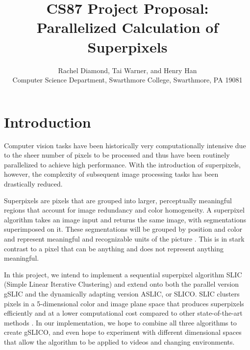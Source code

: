 \documentclass[11pt]{article}
\begin{document}

\title{CS87 Project Proposal: Parallelized Calculation of Superpixels}

\author{Rachel Diamond, Tai Warner, and Henry Han \\
Computer Science Department, Swarthmore College, Swarthmore, PA  19081}

\maketitle

\section {Introduction}\label{intro}
Computer vision tasks have been historically very computationally intensive due to the sheer number of pixels to be processed and thus have been routinely parallelized to achieve high performance. With the introduction of superpixels, however, the complexity of subsequent image processing tasks has been drastically reduced.

Superpixels are pixels that are grouped into larger, perceptually meaningful regions that account for image redundancy and color homogeneity. A superpixel algorithm takes an image input and returns the same image, with segmentations superimposed on it. These segmentations will be grouped by position and color and represent meaningful and recognizable units of the picture \cite{slic}. This is in stark contrast to a pixel that can be anything and does not represent anything meaningful.

In this project, we intend to implement a sequential superpixel algorithm SLIC (Simple Linear Iterative Clustering) and extend onto both the parallel version gSLIC and the dynamically adapting version ASLIC, or SLICO. SLIC clusters pixels in a 5-dimensional color and image plane space that produces superpixels efficiently and at a lower computational cost compared to other state-of-the-art methods \cite{slic}. In our implementation, we hope to combine all three algorithms to create gSLICO, and even hope to experiment with different dimensional spaces that allow the algorithm to be applied to videos and changing environments.
\end{document}
